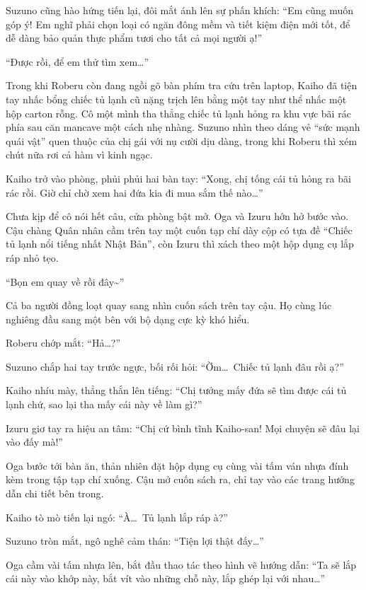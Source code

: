 \documentclass[../main.tex]{subfiles}
\begin{document}
Suzuno cũng hào hứng tiến lại, đôi mắt ánh lên sự phấn khích: ``Em cũng muốn góp ý! Em nghĩ phải chọn loại có ngăn đông mềm và tiết kiệm điện mới tốt, để dễ dàng bảo quản thực phẩm tươi cho tất cả mọi người ạ!''

``Được rồi, để em thử tìm xem\dots''

\ct

Trong khi Roberu còn đang ngồi gõ bàn phím tra cứu trên laptop, Kaiho đã tiện tay nhấc bổng chiếc tủ lạnh cũ nặng trịch lên bằng một tay như thể nhấc một hộp carton rỗng. Cô một mình tha thẳng chiếc tủ lạnh hỏng ra khu vực bãi rác phía sau căn mancave một cách nhẹ nhàng. Suzuno nhìn theo dáng vẻ ``sức mạnh quái vật'' quen thuộc của chị gái với nụ cười dịu dàng, trong khi Roberu thì xém chút nữa rơi cả hàm vì kinh ngạc.

Kaiho trở vào phòng, phủi phủi hai bàn tay: ``Xong, chị tống cái tủ hỏng ra bãi rác rồi. Giờ chỉ chờ xem hai đứa kia đi mua sắm thế nào\dots''

Chưa kịp để cô nói hết câu, cửa phòng bật mở. Oga và Izuru hớn hở bước vào. Cậu chàng Quân nhân cầm trên tay một cuốn tạp chí dày cộp có tựa đề ``Chiếc tủ lạnh nổi tiếng nhất Nhật Bản'', còn Izuru thì xách theo một hộp dụng cụ lắp ráp nhỏ tẹo.


``Bọn em quay về rồi đây\~{}''

Cả ba người đồng loạt quay sang nhìn cuốn sách trên tay cậu. Họ cùng lúc nghiêng đầu sang một bên với bộ dạng cực kỳ khó hiểu.

Roberu chớp mắt: ``Hả\dots?''

Suzuno chắp hai tay trước ngực, bối rối hỏi: ``Ờm\dots\ Chiếc tủ lạnh đâu rồi ạ?''

Kaiho nhíu mày, thẳng thắn lên tiếng: ``Chị tưởng mấy đứa sẽ tìm được cái tủ lạnh chứ, sao lại tha mấy cái này về làm gì?''

Izuru giơ tay ra hiệu an tâm: ``Chị cứ bình tĩnh Kaiho-san! Mọi chuyện sẽ đâu lại vào đấy mà!''

Oga bước tới bàn ăn, thản nhiên đặt hộp dụng cụ cùng vài tấm ván nhựa đính kèm trong tập tạp chí xuống. Cậu mở cuốn sách ra, chỉ tay vào các trang hướng dẫn chi tiết bên trong.

Kaiho tò mò tiến lại ngó: ``À\dots\ Tủ lạnh lắp ráp à?''

Suzuno tròn mắt, ngô nghê cảm thán: ``Tiện lợi thật đấy\dots''

Oga cầm vài tấm nhựa lên, bắt đầu thao tác theo hình vẽ hướng dẫn: ``Ta sẽ lắp cái này vào khớp này, bắt vít vào những chỗ này, lắp ghép lại với nhau\dots''
\end{document}
